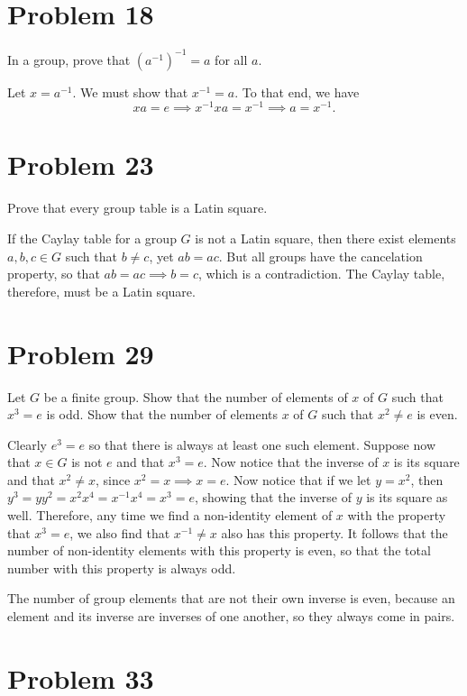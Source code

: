\documentclass[12pt]{article}
\begin{document}
\section*{Problem 18}

In a group, prove that $(a^{-1})^{-1}=a$ for all $a$.

Let $x=a^{-1}$.  We must show that $x^{-1}=a$.  To that end, we have
\begin{equation*}
xa=e\implies x^{-1}xa=x^{-1}\implies a=x^{-1}.
\end{equation*}

\section*{Problem 23}

Prove that every group table is a Latin square.

If the Caylay table for a group $G$ is not a Latin square, then there exist elements $a,b,c\in G$
such that $b\neq c$, yet $ab=ac$.  But all groups have the cancelation property, so that
$ab=ac\implies b=c$, which is a contradiction.  The Caylay table, therefore, must be a Latin square.

\section*{Problem 29}

Let $G$ be a finite group.  Show that the number of elements of $x$ of $G$ such
that $x^3=e$ is odd.  Show that the number of elements $x$ of $G$ such that
$x^2\neq e$ is even.

Clearly $e^3=e$ so that there is always at least one such element.
Suppose now that $x\in G$ is not $e$ and that $x^3=e$.
Now notice that the inverse of $x$ is its square and that $x^2\neq x$,
since $x^2=x\implies x=e$.  Now notice that if we let $y=x^2$,
then $y^3 = yy^2 = x^2x^4 = x^{-1}x^4 = x^3=e$, showing that
the inverse of $y$ is its square as well.  Therefore, any time we find
a non-identity element of $x$ with the property that $x^3=e$, we also find
that $x^{-1}\neq x$ also has this property.  It follows that the number of
non-identity elements with this property is even, so that the total number
with this property is always odd.

The number of group elements that are not their own inverse is even,
because an element and its inverse are inverses of one another, so they
always come in pairs.

\section*{Problem 33}
\end{document}

